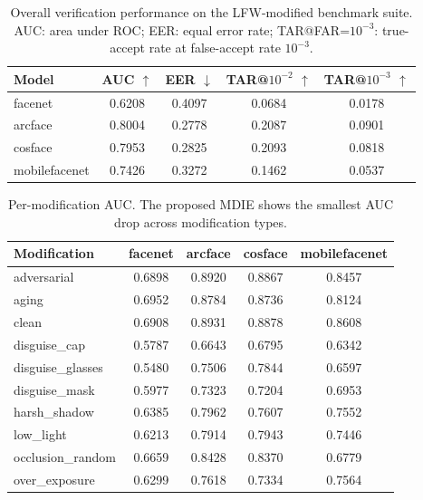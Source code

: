 \begin{table}[t]
\centering
\caption{Overall verification performance on the LFW-modified benchmark suite. AUC: area under ROC; EER: equal error rate; TAR@FAR=$10^{-3}$: true-accept rate at false-accept rate $10^{-3}$.}
\label{tab:overall}
\begin{tabular}{lcccc}
\hline
Model & AUC $\uparrow$ & EER $\downarrow$ & TAR@$10^{-2}$ $\uparrow$ & TAR@$10^{-3}$ $\uparrow$ \\
\hline
facenet & 0.6208 & 0.4097 & 0.0684 & 0.0178 \\
arcface & 0.8004 & 0.2778 & 0.2087 & 0.0901 \\
cosface & 0.7953 & 0.2825 & 0.2093 & 0.0818 \\
mobilefacenet & 0.7426 & 0.3272 & 0.1462 & 0.0537 \\
\hline
\end{tabular}
\end{table}

\begin{table}[t]
\centering
\caption{Per-modification AUC. The proposed MDIE shows the smallest AUC drop across modification types.}
\label{tab:permod}
\begin{tabular}{lcccc}
\hline
Modification & facenet & arcface & cosface & mobilefacenet \\
\hline
adversarial & 0.6898 & 0.8920 & 0.8867 & 0.8457 \\
aging & 0.6952 & 0.8784 & 0.8736 & 0.8124 \\
clean & 0.6908 & 0.8931 & 0.8878 & 0.8608 \\
disguise_cap & 0.5787 & 0.6643 & 0.6795 & 0.6342 \\
disguise_glasses & 0.5480 & 0.7506 & 0.7844 & 0.6597 \\
disguise_mask & 0.5977 & 0.7323 & 0.7204 & 0.6953 \\
harsh_shadow & 0.6385 & 0.7962 & 0.7607 & 0.7552 \\
low_light & 0.6213 & 0.7914 & 0.7943 & 0.7446 \\
occlusion_random & 0.6659 & 0.8428 & 0.8370 & 0.6779 \\
over_exposure & 0.6299 & 0.7618 & 0.7334 & 0.7564 \\
\hline
\end{tabular}
\end{table}
